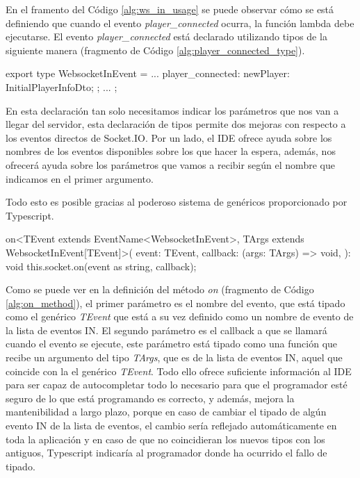 En el framento del Código \ref{alg:ws_in_usage} se puede observar cómo se está definiendo que cuando el evento \textit{player\_connected} ocurra, la función lambda debe ejecutarse. El evento \textit{player\_connected} está declarado utilizando tipos de la siguiente manera (fragmento de Código \ref{alg:player_connected_type}).

\begin{mytypescript}[float={!h},caption={Ejemplo de declaración de la comunicación IN.},label={alg:player_connected_type}]
	export type WebsocketInEvent = {
		...
		player_connected: {
			newPlayer: InitialPlayerInfoDto;
		};
		...
	};
\end{mytypescript}

En esta declaración tan solo necesitamos indicar los parámetros que nos van a llegar del servidor, esta declaración de tipos permite dos mejoras con respecto a los eventos directos de Socket.IO. Por un lado, el IDE ofrece ayuda sobre los nombres de los eventos disponibles sobre los que hacer la espera, además, nos ofrecerá ayuda sobre los parámetros que vamos a recibir según el nombre que indicamos en el primer argumento.

Todo esto es posible gracias al poderoso sistema de genéricos proporcionado por Typescript.

\begin{mytypescript}[float={!h},caption={Declaración del método \textit{on}.},label={alg:on_method}]
	on<TEvent extends EventName<WebsocketInEvent>, TArgs extends WebsocketInEvent[TEvent]>(
	event: TEvent,
	callback: (args: TArgs) => void,
	): void {
		this.socket.on(event as string, callback);
	}
\end{mytypescript}

Como se puede ver en la definición del método \textit{on} (fragmento de Código \ref{alg:on_method}), el primer parámetro es el nombre del evento, que está tipado como el genérico \textit{TEvent} que está a su vez definido como un nombre de evento de la lista de eventos IN. El segundo parámetro es el callback a que se llamará cuando el evento se ejecute, este parámetro está tipado como una función que recibe un argumento del tipo \textit{TArgs}, que es de la lista de eventos IN, aquel que coincide con la el genérico \textit{TEvent}. Todo ello ofrece suficiente información al IDE para ser capaz de autocompletar todo lo necesario para que el programador esté seguro de lo que está programando es correcto, y además, mejora la mantenibilidad a largo plazo, porque en caso de cambiar el tipado de algún evento IN de la lista de eventos, el cambio sería reflejado automáticamente en toda la aplicación y en caso de que no coincidieran los nuevos tipos con los antiguos, Typescript indicaría al programador donde ha ocurrido el fallo de tipado.

